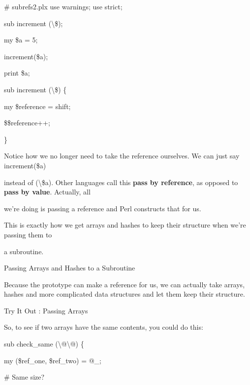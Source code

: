 \documentclass[a4paper,11pt]{book}
\begin{document}
\noindent \# subrefs2.plx use warnings; use strict;

\noindent sub increment (\textbackslash \$);

\noindent 

\noindent 

\noindent my \$a = 5;

\noindent increment(\$a);

\noindent print \$a;

\noindent 

\noindent 

\noindent sub increment (\textbackslash \$) \{

\noindent my \$reference = shift;

\noindent \$\$reference++;

\noindent \}

\noindent 

\noindent Notice how we no longer need to take the reference ourselves. We can just say increment(\$a)

\noindent instead of (\textbackslash \$a). Other languages call this \textbf{pass by reference}, as opposed to \textbf{pass by value}. Actually, all

\noindent we're doing is passing a reference and Perl constructs that for us.

\noindent 

\noindent This  is exactly how  we  get arrays  and  hashes  to  keep  their  structure  when  we're  passing  them  to

\noindent a subroutine.

\noindent 

\noindent 

\noindent Passing Arrays and Hashes to a Subroutine

\noindent Because the prototype can make a reference for us, we can actually take arrays, hashes and more complicated data structures and let them keep their structure.

\noindent 

\noindent Try It Out : Passing Arrays

\noindent 

\noindent So, to see if two arrays have the same contents, you could do this:

\noindent 

\noindent sub check\_same (\textbackslash @\textbackslash @) \{

\noindent my (\$ref\_one, \$ref\_two) = @\_;

\noindent \# Same size?
\end{document}
